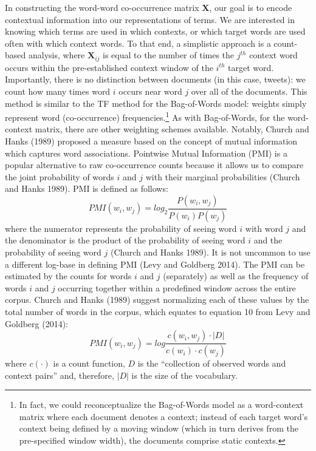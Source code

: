 \documentclass{article}
\begin{document}
In constructing the word-word co-occurrence matrix \(\mathbf{X}\), our
goal is to encode contextual information into our representations of
terms. We are interested in knowing which terms are used in which
contexts, or which target words are used often with which context words.
To that end, a simplistic approach is a count-based analysis, where
\(\mathbf{X}_{ij}\) is equal to the number of times the \(j^{th}\)
context word occurs within the pre-established context window of the
\(i^{th}\) target word. Importantly, there is no distinction between
documents (in this case, tweets): we count how many times word \(i\)
occurs near word \(j\) over all of the documents. This method is similar
to the TF method for the Bag-of-Words model: weights simply represent
word (co-occurrence) frequencies.\footnote{In fact, we could
  reconceptualize the Bag-of-Words model as a word-context matrix where
  each document denotes a context; instead of each target word's context
  being defined by a moving window (which in turn derives from the
  pre-specified window width), the documents comprise static contexts.}
As with Bag-of-Words, for the word-context matrix, there are other
weighting schemes available. Notably, Church and Hanks (1989) proposed a
measure based on the concept of mutual information which captures word
associations. Pointwise Mutual Information (PMI) is a popular
alternative to raw co-occurrence counts because it allows us to compare
the joint probability of words \(i\) and \(j\) with their marginal
probabilities (Church and Hanks 1989). PMI is defined as follows:
\[PMI(w_i, w_j) = log_2 \frac {P(w_i, w_j)} {P(w_i)P(w_j)}\] where the
numerator represents the probability of seeing word \(i\) with word
\(j\) and the denominator is the product of the probability of seeing
word \(i\) and the probability of seeing word \(j\) (Church and Hanks
1989). It is not uncommon to use a different log-base in defining PMI
(Levy and Goldberg 2014). The PMI can be estimated by the counts for
words \(i\) and \(j\) (separately) as well as the frequency of words
\(i\) and \(j\) occurring together within a predefined window across the
entire corpus. Church and Hanks (1989) suggest normalizing each of these
values by the total number of words in the corpus, which equates to
equation 10 from Levy and Goldberg (2014):
\[PMI(w_i, w_j) = log \frac {c(w_i, w_j) \cdot |D|} {c(w_i) \cdot c(w_j)}\]
where \(c(\cdot)\) is a count function, \(D\) is the ``collection of
observed words and context pairs'' and, therefore, \(|D|\) is the size
of the vocabulary.
\end{document}
